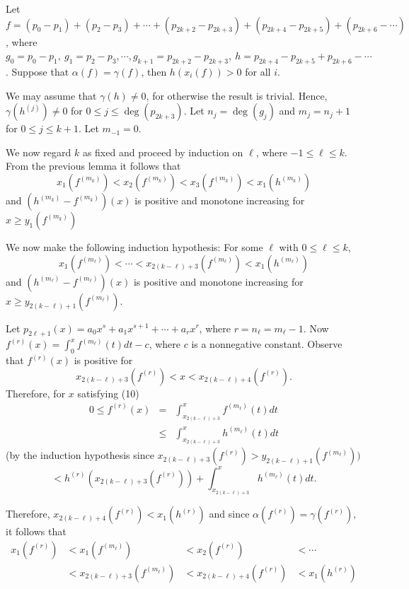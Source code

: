 \begin{lemma} Let $f = (p_0 - p_1) + (p_2 - p_3) + \cdots + (p_{2k+2}
- p_{2k+3}) + (p_{2k+4} - p_{2k+5}) + (p_{2k+6} - \cdots )$, where
$g_0 = p_0 - p_1,\ g_1 = p_2 - p_3, \cdots, g_{k+1} = p_{2k+2} -
p_{2k+3},\ h = p_{2k+4} - p_{2k+5} + p_{2k+6} - \cdots$.  Suppose
that $\alpha (f) = \gamma (f)$, then $h(x_i (f)) > 0$ for all
$i$.\end{lemma}

  We may assume that $\gamma (h) \neq 0$, for
otherwise the result is trivial.  Hence, $\gamma (h^{(j)}) \neq 0$
for $0 \leq j \leq \deg (p_{2k+3})$.  Let $n_j = \deg (g_j)$
and $m_j = n_j +1$ for $0 \leq j \leq k+1$.  Let $m_{-1} =0$.

We now regard $k$ as fixed and proceed by induction on $\ell$, where
$-1 \leq \ell \leq k$.  From the previous lemma it follows that 
$$x_1 (f^{(m_k)}) < x_2 (f^{(m_k)}) < x_3 (f^{(m_k)}) < x_1 (h^{(m_k)})$$
and $(h^{(m_k)} - f^{(m_k)})(x)$ is positive and
monotone increasing for $x \geq y_1
(f^{(m_k)})$

We now make the following induction hypothesis: For some $\ell$ with
$0 \leq \ell \leq k$, $$x_1 (f^{(m_\ell)}) < \cdots < x_{2(k-\ell)
+3} (f^{(m_\ell)}) < x_1 (h^{(m_\ell)})$$ and $(h^{(m_\ell)} -
f^{(m_\ell)}) (x)$ is positive and monotone increasing for $x \geq
y_{2(k-\ell)+1} (f^{(m_\ell)})$.

Let $p_{2\ell+1} (x) = a_0 x^s + a_1 x^{s+1} + \cdots + a_r x^r$,
where $r = n_\ell = m_\ell -1$.  Now $f^{(r)} (x) = {\int^x_0}
f^{(m_\ell)} (t) dt - c$, where $c$ is a nonnegative constant.
Observe that $f^{(r)} (x)$ is positive for \begin{equation}
x_{2(k-\ell)+3} (f^{(r)}) < x < x_{2(k-\ell)+4}
(f^{(r)}).\label{eq:10}\end{equation} Therefore, for $x$ satisfying (10)
\begin{eqnarray*} 0 \leq f^{(r)} (x) & = & \int^x_{x_{2(k-\ell)+3}}
f^{(m_\ell)} (t) dt\\[2ex] & \leq & \int^x_{x_{2(k-\ell) +3}}
h^{(m_\ell)} (t) dt\end{eqnarray*} (by the induction hypothesis since
$x_{2(k-\ell)+3} (f^{(r)}) > y_{2(k-\ell)+1}(f^{(m_\ell)}))$ $$<
h^{(r)}(x_{2(k-\ell)+3}(f^{(r)})) + \int^x_{x_{2(k-\ell)+3}}
h^{(m_\ell)} (t) dt.$$

Therefore, 
$x_{2(k-\ell)+4} (f^{(r)}) < x_1
(h^{(r)})$ 
and since 
$\alpha (f^{(r)}) = \gamma (f^{(r)}),$
it follows that
\begin{equation}\begin{array}{llll}x_1(f^{(r)}) &<
x_1(f^{(m_\ell)}) &< x_2(f^{(r)}) &< \cdots \\[2ex]
&< x_{2(k-\ell)+3}(f^{(m_\ell)}) &< x_{2(k-\ell)+4} (f^{(r)}) &< x_1 (h^{(r)})
\end{array}
\label{eq:11}\end{equation}

